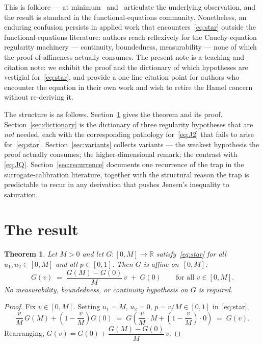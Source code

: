 \documentclass[11pt,a4paper]{amsart}
\newtheorem{theorem}{Theorem}
\newcommand{\R}{\mathbb R}
\begin{document}
This is folklore --- at minimum~\cite{Aczel1966} and~\cite{Kuczma2009}
articulate the underlying observation, and the result is standard in the
functional-equations community. Nonetheless, an enduring confusion persists
in applied work that encounters~\eqref{eq:star} outside the
functional-equations literature: authors reach reflexively for the
Cauchy-equation regularity machinery --- continuity, boundedness,
measurability --- none of which the proof of affineness actually consumes.
The present note is a teaching-and-citation note: we exhibit the proof and
the dictionary of which hypotheses are vestigial for~\eqref{eq:star}, and
provide a one-line citation point for authors who encounter the equation in
their own work and wish to retire the Hamel concern without re-deriving it.

The structure is as follows. Section~\ref{sec:result} gives the theorem and
its proof. Section~\ref{sec:dictionary} is the dictionary of three regularity
hypotheses that are \emph{not} needed, each with the corresponding pathology
for~\eqref{eq:J2} that fails to arise for~\eqref{eq:star}.
Section~\ref{sec:variants} collects variants --- the weakest hypothesis the
proof actually consumes; the higher-dimensional remark; the contrast with
\eqref{eq:JQ}. Section~\ref{sec:recurrence} documents one recurrence of the
trap in the surrogate-calibration literature, together with the structural
reason the trap is predictable to recur in any derivation that pushes
Jensen's inequality to saturation.

\section{The result}
\label{sec:result}

\begin{theorem}
\label{thm:main}
Let $M>0$ and let $G\colon[0,M]\to\R$ satisfy~\eqref{eq:star} for all
$u_1,u_2\in[0,M]$ and all $p\in[0,1]$. Then $G$ is affine on~$[0,M]$:
\[
G(v) \;=\; \frac{G(M)-G(0)}{M}\,v \;+\; G(0)
\qquad \text{for all } v\in[0,M].
\]
No measurability, boundedness, or continuity hypothesis on $G$ is required.
\end{theorem}

\begin{proof}
Fix $v\in[0,M]$. Setting $u_1=M$, $u_2=0$, $p=v/M\in[0,1]$
in~\eqref{eq:star},
\[
\frac{v}{M}\,G(M) + \left(1-\frac{v}{M}\right)G(0)
\;=\; G\!\left(\frac{v}{M}\cdot M + \left(1-\frac{v}{M}\right)\cdot 0\right)
\;=\; G(v).
\]
Rearranging, $G(v) = G(0) + \dfrac{G(M)-G(0)}{M}\,v$.
\end{proof}
\end{document}
